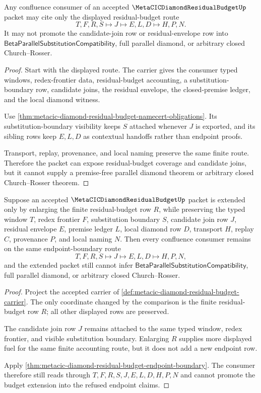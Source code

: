 \begin{theorem}
\label{thm:metacic-diamond-residual-budget-endpoint-boundary}
Any confluence consumer of an accepted $\MetaCICDiamondResidualBudgetUp$ packet may cite only the displayed residual-budget route
$$
T,F,R,S \longmapsto J \longmapsto E,L,D \longmapsto H,P,N .
$$
It may not promote the candidate-join row or residual-envelope row into $\mathsf{BetaParallelSubstitutionCompatibility}$, full parallel diamond, or arbitrary closed Church--Rosser.
\end{theorem}
\begin{proof}
Start with the displayed route. The carrier gives the consumer typed windows, redex-frontier data, residual-budget accounting, a substitution-boundary row, candidate joins, the residual envelope, the closed-premise ledger, and the local diamond witness.

Use \autoref{thm:metacic-diamond-residual-budget-namecert-obligations}. Its substitution-boundary visibility keeps $S$ attached whenever $J$ is exported, and its sibling rows keep $E,L,D$ as contextual handoffs rather than endpoint proofs.

Transport, replay, provenance, and local naming preserve the same finite route. Therefore the packet can expose residual-budget coverage and candidate joins, but it cannot supply a premise-free parallel diamond theorem or arbitrary closed Church--Rosser theorem.
\end{proof}

\begin{theorem}
\label{thm:metacic-diamond-residual-budget-fuel-monotonicity}
Suppose an accepted $\MetaCICDiamondResidualBudgetUp$ packet is extended only by
enlarging the finite residual-budget row $R$, while preserving the typed window
$T$, redex frontier $F$, substitution boundary $S$, candidate join row $J$,
residual envelope $E$, premise ledger $L$, local diamond row $D$, transport
$H$, replay $C$, provenance $P$, and local naming $N$. Then every confluence
consumer remains on the same endpoint-boundary route
$$
T,F,R,S \longmapsto J \longmapsto E,L,D \longmapsto H,P,N ,
$$
and the extended packet still cannot infer
$\mathsf{BetaParallelSubstitutionCompatibility}$, full parallel diamond, or
arbitrary closed Church--Rosser.
\end{theorem}
\begin{proof}
Project the accepted carrier of
\autoref{def:metacic-diamond-residual-budget-carrier}. The only coordinate
changed by the comparison is the finite residual-budget row $R$; all other
displayed rows are preserved.

The candidate join row $J$ remains attached to the same typed window, redex
frontier, and visible substitution boundary. Enlarging $R$ supplies more
displayed fuel for the same finite accounting route, but it does not add a new
endpoint row.

Apply
\autoref{thm:metacic-diamond-residual-budget-endpoint-boundary}. The consumer
therefore still reads through $T,F,R,S,J,E,L,D,H,P,N$ and cannot promote the
budget extension into the refused endpoint claims.
\end{proof}

